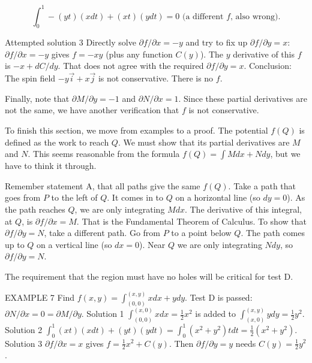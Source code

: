$$\int_0^1-(yt)(x dt) + (xt)(y dt) = 0 \text{ (a different }f \text{, also wrong).}$$

Attempted solution 3 Directly solve $\partial f/\partial x = -y$ and try to fix up $\partial f/\partial y = x$:
$\partial f/\partial x = -y$ gives $f = -xy$ (plus any function $C(y)$).
The $y$ derivative of this $f$ is $-x + dC/dy$. That does not agree with the required
$\partial f/\partial y = x$. Conclusion: The spin field $-y\vec i + x\vec j$ is not conservative. There is no $f$.

Finally, note that $\partial M/\partial y = -1$ and $\partial N/\partial x =  1$. Since these partial derivatives are not the same, we have another verification that $f$ is not conservative.

To finish this section, we move from examples to a proof. The potential $f(Q)$ is
defined as the work to reach $Q$. We must show that its partial derivatives are $M$ and
$N$. This seems reasonable from the formula $f (Q) = \int M dx + N dy$, but we have to
think it through.

Remember statement A, that all paths give the same $f(Q)$. Take a path that goes
from $P$ to the left of $Q$. It comes in to $Q$ on a horizontal line (so $dy = 0$). As the
path reaches $Q$, we are only integrating $M dx$. The derivative of this integral, at $Q$, is
$\partial f/\partial x = M$. That is the Fundamental Theorem of Calculus.
To show that $\partial f/\partial y= N$, take a different path. Go from $P$ to a point below $Q$. The
path comes up to $Q$ on a vertical line (so $dx = 0$). Near $Q$ we are only integrating
$N dy$, so $\partial f/\partial y= N$.

The requirement that the region must have no holes will be critical for test D.

EXAMPLE 7 Find $f (x, y) =\int_{(0,0)}^{(x,y)} x dx + y dy$. Test D is passed: $\partial N/\partial x= 0= \partial M/\partial y$.
Solution 1 $\int_{(0,0)}^{(x,0)} x dx = \frac{1}{2}x^2$ is added to $\int_{(x,0)}^{(x,y)} y dy = \frac{1}{2}y^2$.
Solution 2 $\int_0^1 (xt)(x dt) + (yt)(y dt) = \int_0^1 (x^2+ y^2)t dt =\frac{1}{2}(x^2+ y^2)$.
Solution 3 $\partial f/\partial x = x$ gives $f = \frac{1}{2}x^2+ C(y)$. Then $\partial f/\partial y = y$ needs $C(y)= \frac{1}{2}y^2$. 

